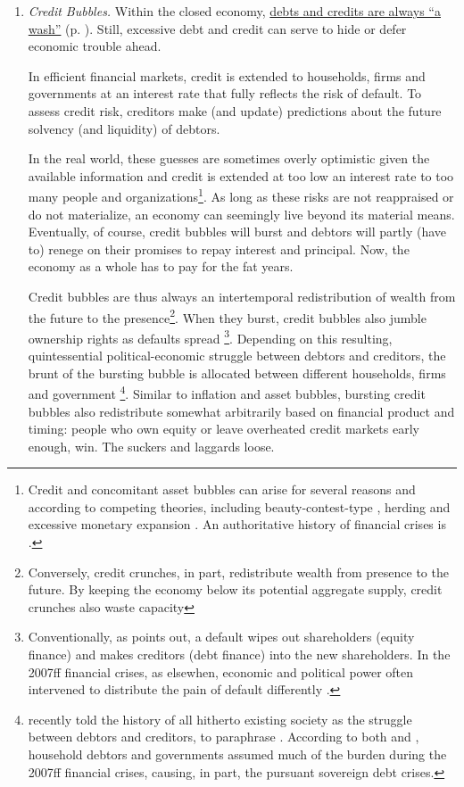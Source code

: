 \begin{enumerate}
	\item {} \label{it:creditbubbles} \emph{Credit Bubbles.} Within the closed economy, \hyperref[it:creditsdebitswash]{debts and credits are always ``a wash''} (p. \pageref{it:creditsdebitswash}). Still, excessive debt and credit can serve to hide or defer economic trouble ahead. 

	In efficient financial markets, credit is extended to households, firms and governments at an interest rate that fully reflects the risk of default. To assess credit risk, creditors make (and update) predictions about the future solvency (and liquidity) of debtors. 

	In the real world, these guesses are sometimes overly optimistic given the available information and credit is extended at too low an interest rate to too many people and organizations\footnote{
		Credit and concomitant asset bubbles can arise for several reasons and according to competing theories, including beauty-contest-type \citep{Keynes1936}, herding \citep{Banerjee-1992-aa} and excessive monetary expansion \citep{Stiglitz2010}. An authoritative history of financial crises is \cite{KindlebergerAliber-2005-aa}.}. 
	As long as these risks are not reappraised or do not materialize, an economy can seemingly live beyond its material means. Eventually, of course, credit bubbles will burst and debtors will partly (have to) renege on their promises to repay interest and principal. Now, the economy as a whole has to pay for the fat years.

	Credit bubbles are thus always an intertemporal redistribution of wealth from the future to the presence\footnote{
		Conversely, credit crunches, in part, redistribute wealth from presence to the future. By keeping the economy below its potential aggregate supply, credit crunches also waste capacity}. 
	When they burst, credit bubbles also jumble ownership rights as defaults spread \citep{Stiglitz2010}\footnote{
		Conventionally, as \citeauthor{Stiglitz2010} points out, a default wipes out shareholders (equity finance) and makes creditors (debt finance) into the new shareholders. In the 2007ff financial crises, as elsewhen, economic and political power often intervened to distribute the pain of default differently \citep{Stiglitz2010}.}. 
	Depending on this resulting, quintessential political-economic struggle between debtors and creditors, the brunt of the bursting bubble is allocated between different households, firms and government \citep{Coggan2011}\footnote{
		\citealt{Coggan2011} recently told the history of all hitherto existing society as the struggle between debtors and creditors, to paraphrase \cite{MarxEngels-1848-aa}. According to both \citeauthor{Coggan2011} and \cite{Stiglitz2010}, household debtors and governments assumed much of the burden during the 2007ff financial crises, causing, in part, the pursuant sovereign debt crises.}. 
	Similar to inflation and asset bubbles, bursting credit bubbles also redistribute somewhat arbitrarily based on financial product and timing: people who own equity or leave overheated credit markets early enough, win. The suckers and laggards loose.


\end{enumerate}

